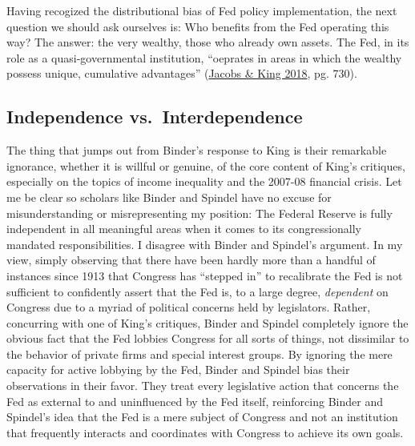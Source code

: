 \documentclass[
  11pt,
]{article}
\begin{document}
Having recogized the distributional bias of Fed policy implementation,
the next question we should ask ourselves is: Who benefits from the Fed
operating this way? The answer: the very wealthy, those who already own
assets. The Fed, in its role as a quasi-governmental institution,
``oeprates in areas in which the wealthy possess unique, cumulative
advantages'' (\protect\hyperlink{ref-jacobs2018d}{Jacobs \& King 2018},
pg. 730).

\hypertarget{independence-vs.-interdependence}{%
\subsection{Independence
vs.~Interdependence}\label{independence-vs.-interdependence}}

The thing that jumps out from Binder's response to King is their
remarkable ignorance, whether it is willful or genuine, of the core
content of King's critiques, especially on the topics of income
inequality and the 2007-08 financial crisis. Let me be clear so scholars
like Binder and Spindel have no excuse for misunderstanding or
misrepresenting my position: The Federal Reserve is fully independent in
all meaningful areas when it comes to its congressionally mandated
responsibilities. I disagree with Binder and Spindel's argument. In my
view, simply observing that there have been hardly more than a handful
of instances since 1913 that Congress has ``stepped in'' to recalibrate
the Fed is not sufficient to confidently assert that the Fed is, to a
large degree, \emph{dependent} on Congress due to a myriad of political
concerns held by legislators. Rather, concurring with one of King's
critiques, Binder and Spindel completely ignore the obvious fact that
the Fed lobbies Congress for all sorts of things, not dissimilar to the
behavior of private firms and special interest groups. By ignoring the
mere capacity for active lobbying by the Fed, Binder and Spindel bias
their observations in their favor. They treat every legislative action
that concerns the Fed as external to and uninfluenced by the Fed itself,
reinforcing Binder and Spindel's idea that the Fed is a mere subject of
Congress and not an institution that frequently interacts and
coordinates with Congress to achieve its own goals.
\end{document}
